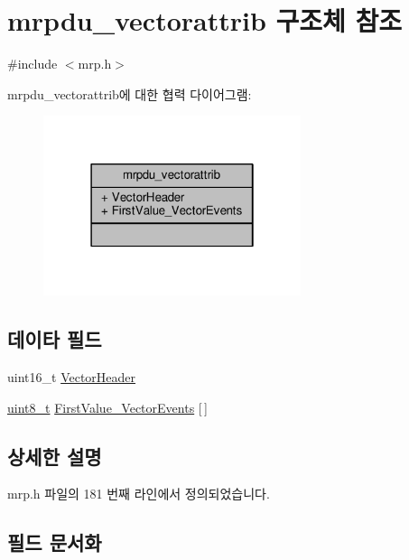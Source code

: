 \hypertarget{structmrpdu__vectorattrib}{}\section{mrpdu\+\_\+vectorattrib 구조체 참조}
\label{structmrpdu__vectorattrib}


{\ttfamily \#include $<$mrp.\+h$>$}



mrpdu\+\_\+vectorattrib에 대한 협력 다이어그램\+:
\nopagebreak
\begin{figure}[H]
\begin{center}
\leavevmode
\includegraphics[width=214pt]{structmrpdu__vectorattrib__coll__graph}
\end{center}
\end{figure}
\subsection*{데이타 필드}
\begin{DoxyCompactItemize}
\item 
uint16\+\_\+t \hyperlink{structmrpdu__vectorattrib_af3ce9d09162a6ac7a51a5e8ef1166f94}{Vector\+Header}
\item 
\hyperlink{stdint_8h_aba7bc1797add20fe3efdf37ced1182c5}{uint8\+\_\+t} \hyperlink{structmrpdu__vectorattrib_aadb45c52c58d863f199ba2cb4e450e6d}{First\+Value\+\_\+\+Vector\+Events} \mbox{[}$\,$\mbox{]}
\end{DoxyCompactItemize}


\subsection{상세한 설명}


mrp.\+h 파일의 181 번째 라인에서 정의되었습니다.



\subsection{필드 문서화}
